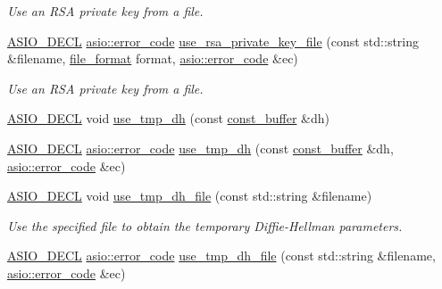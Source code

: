 \begin{DoxyCompactItemize}
\begin{DoxyCompactList}\small\item\em Use an R\+S\+A private key from a file. \end{DoxyCompactList}\item 
\hyperlink{config_8hpp_ab54d01ea04afeb9a8b39cfac467656b7}{A\+S\+I\+O\+\_\+\+D\+E\+C\+L} \hyperlink{classasio_1_1error__code}{asio\+::error\+\_\+code} \hyperlink{classasio_1_1ssl_1_1context_adc178b9bf727e81ce9e36192495eaaf2}{use\+\_\+rsa\+\_\+private\+\_\+key\+\_\+file} (const std\+::string \&filename, \hyperlink{classasio_1_1ssl_1_1context__base_acc846aa73fffcab1fecad36dcf2be1fb}{file\+\_\+format} format, \hyperlink{classasio_1_1error__code}{asio\+::error\+\_\+code} \&ec)
\begin{DoxyCompactList}\small\item\em Use an R\+S\+A private key from a file. \end{DoxyCompactList}\item 
\hyperlink{config_8hpp_ab54d01ea04afeb9a8b39cfac467656b7}{A\+S\+I\+O\+\_\+\+D\+E\+C\+L} void \hyperlink{classasio_1_1ssl_1_1context_a37845fbafedc93750e97363a4566978f}{use\+\_\+tmp\+\_\+dh} (const \hyperlink{classasio_1_1const__buffer}{const\+\_\+buffer} \&dh)
\item 
\hyperlink{config_8hpp_ab54d01ea04afeb9a8b39cfac467656b7}{A\+S\+I\+O\+\_\+\+D\+E\+C\+L} \hyperlink{classasio_1_1error__code}{asio\+::error\+\_\+code} \hyperlink{classasio_1_1ssl_1_1context_a720421f602fb159b83451ec989c54603}{use\+\_\+tmp\+\_\+dh} (const \hyperlink{classasio_1_1const__buffer}{const\+\_\+buffer} \&dh, \hyperlink{classasio_1_1error__code}{asio\+::error\+\_\+code} \&ec)
\item 
\hyperlink{config_8hpp_ab54d01ea04afeb9a8b39cfac467656b7}{A\+S\+I\+O\+\_\+\+D\+E\+C\+L} void \hyperlink{classasio_1_1ssl_1_1context_a1acfb3b856a76f5232efe7ba0d9de97d}{use\+\_\+tmp\+\_\+dh\+\_\+file} (const std\+::string \&filename)
\begin{DoxyCompactList}\small\item\em Use the specified file to obtain the temporary Diffie-\/\+Hellman parameters. \end{DoxyCompactList}\item 
\hyperlink{config_8hpp_ab54d01ea04afeb9a8b39cfac467656b7}{A\+S\+I\+O\+\_\+\+D\+E\+C\+L} \hyperlink{classasio_1_1error__code}{asio\+::error\+\_\+code} \hyperlink{classasio_1_1ssl_1_1context_ab739c59e9cb695de574063745cdb5bbf}{use\+\_\+tmp\+\_\+dh\+\_\+file} (const std\+::string \&filename, \hyperlink{classasio_1_1error__code}{asio\+::error\+\_\+code} \&ec)

\end{DoxyCompactItemize}
